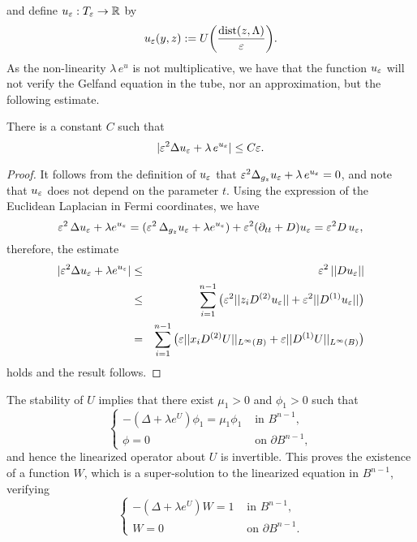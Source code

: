 \noindent and define $u_\varepsilon:T_\varepsilon\to \mathbb{R}$ by
$$
u_\varepsilon(y,z):=U\bigg(\frac{\mbox{dist}(z,\Lambda)}{\varepsilon}\bigg).
$$
As the non-linearity $\lambda\,e^u$ is not multiplicative, we have that the
function $u_\varepsilon$ will not verify the Gelfand equation in the tube, nor an
approximation, but the following estimate.

\begin{lemma}\label{lem-bound_Cepsilon} There is a constant $C$ such that
\begin{equation}
|\varepsilon^2\Delta u_\varepsilon+\lambda\, e^{u_\varepsilon}|\leq C\varepsilon.
\end{equation}
\end{lemma}

\begin{proof} It follows from the definition of $u_\varepsilon$ that
$\varepsilon^2\Delta_{g_z}u_\varepsilon + \lambda\, e^{u_\varepsilon}=0$, and note that $u_\varepsilon$ does not
depend on the parameter $t$. Using the expression of the Euclidean Laplacian in
Fermi coordinates, we have
$$\varepsilon^2\, \Delta u_\varepsilon+\lambda e^{u_\varepsilon} = (\varepsilon^2\, \Delta_{g_z} u_\varepsilon +
\lambda e^{u_\varepsilon})+\varepsilon^2(\partial_{tt}+D)u_\varepsilon = \varepsilon^2 D\, u_\varepsilon,
$$
therefore, the estimate
\begin{eqnarray}
|\varepsilon^2\Delta u_\varepsilon + \lambda e^{u_\varepsilon}|&\leq& \varepsilon^2\, ||Du_\varepsilon|| \\
&\leq& \sum_{i=1}^{n-1} \big(\varepsilon^2||z_iD^{(2)}u_\varepsilon||+\varepsilon^2||D^{(1)}u_\varepsilon||\big)\\
    &=& \sum_{i=1}^{n-1}\big(\varepsilon
    ||x_iD^{(2)}U||_{L^\infty(B)}+\varepsilon||D^{(1)}U||_{L^\infty(B)}\big)
\end{eqnarray}
holds and the result follows.
\end{proof}
\medskip

The stability of $U$ implies that there exist $\mu_1>0$ and $\phi_1>0$ such that
\begin{equation}
\left\{\begin{array}{cc}
-(\Delta+\lambda e^U)\phi_1=\mu_1\phi_1 & \mbox{ in }B^{n-1},\\
\phi=0 & \mbox{ on }\partial B^{n-1},
\end{array}\right.
\end{equation}
and hence the linearized operator about $U$ is invertible. This proves the
existence of a function $W$, which is a super-solution to the linearized
equation in $B^{n-1}$, verifying
\begin{equation}
\left\{\begin{array}{cc}
-(\Delta+\lambda e^U)W=1 & \mbox{ in }B^{n-1},\\
W=0 & \mbox{ on }\partial B^{n-1}.
\end{array}\right.
\end{equation}

